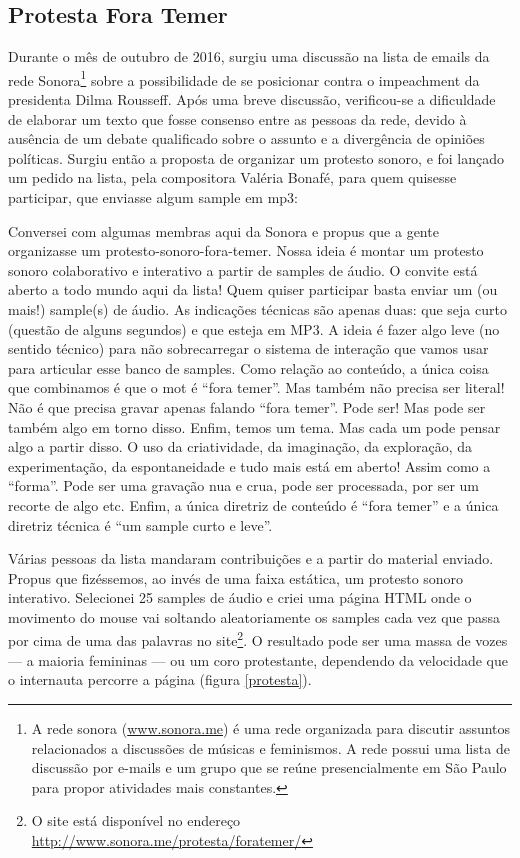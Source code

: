 \subsection{Protesta Fora Temer}
Durante o mês de outubro de 2016, surgiu uma discussão na lista de emails da rede Sonora\footnote{A rede sonora (\url{www.sonora.me}) é uma rede organizada para discutir assuntos relacionados a discussões de músicas e feminismos. A rede possui uma lista de discussão por e-mails e um grupo que se reúne presencialmente em São Paulo para propor atividades mais constantes.} sobre a possibilidade de se posicionar contra o impeachment da presidenta Dilma Rousseff. Após uma breve discussão, verificou-se a dificuldade de elaborar um texto que fosse consenso entre as pessoas da rede, devido à ausência de um debate qualificado sobre o assunto e a divergência de opiniões políticas. 
Surgiu então a proposta de organizar um protesto sonoro, e foi lançado um pedido na lista, pela compositora Valéria Bonafé, para quem quisesse participar, que enviasse algum sample em mp3: 
\begin{citacao}

Conversei com algumas membras aqui da Sonora e propus que a gente organizasse um protesto-sonoro-fora-temer. Nossa ideia é montar um protesto sonoro colaborativo e interativo a partir de samples de áudio. O convite está aberto a todo mundo aqui da lista! Quem quiser participar basta enviar um (ou mais!) sample(s) de áudio. As indicações técnicas são apenas duas: que seja curto (questão de alguns segundos) e que esteja em MP3. A ideia é fazer algo leve (no sentido técnico) para não sobrecarregar o sistema de interação que vamos usar para articular esse banco de samples. Como relação ao conteúdo, a única coisa que combinamos é que o mot é “fora temer”. Mas também não precisa ser literal! Não é que precisa gravar apenas falando “fora temer”. Pode ser! Mas pode ser também algo em torno disso. Enfim, temos um tema. Mas cada um pode pensar algo a partir disso. O uso da criatividade, da imaginação, da exploração, da experimentação, da espontaneidade e tudo mais está em aberto! Assim como a “forma”. Pode ser uma gravação nua e crua, pode ser processada, por ser um recorte de algo etc. Enfim, a única diretriz de conteúdo é “fora temer” e a única diretriz técnica é “um sample curto e leve”.
\end{citacao}
Várias pessoas da lista mandaram contribuições e a partir do material enviado. Propus que fizéssemos, ao invés de uma faixa estática, um protesto sonoro interativo. Selecionei 25 samples de áudio e criei uma página HTML onde o movimento do mouse vai soltando aleatoriamente os samples cada vez que passa por cima de uma das palavras no site\footnote{O site está disponível no endereço \url{http://www.sonora.me/protesta/foratemer/}}. O resultado pode ser uma massa de vozes --- a maioria femininas --- ou um coro protestante, dependendo da velocidade que o internauta percorre a página (figura \ref{protesta}). 

